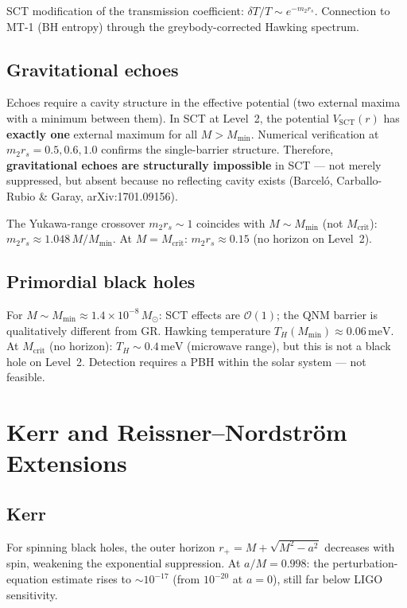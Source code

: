 \documentclass[11pt,a4paper]{article}
\newcommand{\order}[1]{\mathcal{O}(#1)}
\newcommand{\Msun}{M_\odot}
\newcommand{\Mcrit}{M_{\mathrm{crit}}}
\newcommand{\Mmin}{M_{\mathrm{min}}}
\begin{document}
SCT modification of the transmission coefficient:
$\delta T / T \sim e^{-m_2 r_s}$. Connection to MT-1 (BH entropy)
through the greybody-corrected Hawking spectrum.

\subsection{Gravitational echoes}

Echoes require a cavity structure in the effective potential (two external
maxima with a minimum between them). In SCT at Level~2, the potential
$V_{\mathrm{SCT}}(r)$ has \textbf{exactly one} external maximum for
all $M > \Mmin$. Numerical verification at $m_2 r_s = 0.5, 0.6, 1.0$
confirms the single-barrier structure. Therefore, \textbf{gravitational
echoes are structurally impossible} in SCT --- not merely suppressed,
but absent because no reflecting cavity exists
(Barcel\'o, Carballo-Rubio \& Garay, arXiv:1701.09156).

The Yukawa-range crossover $m_2 r_s \sim 1$ coincides with $M \sim \Mmin$
(not $\Mcrit$): $m_2 r_s \approx 1.048\,M/\Mmin$.
At $M = \Mcrit$: $m_2 r_s \approx 0.15$ (no horizon on Level~2).

\subsection{Primordial black holes}

For $M \sim \Mmin \approx 1.4 \times 10^{-8}\,\Msun$:
SCT effects are $\order{1}$; the QNM barrier is qualitatively different from GR.
Hawking temperature $T_H(M_{\min}) \approx 0.06\,\mathrm{meV}$.
At $\Mcrit$ (no horizon): $T_H \sim 0.4\,\mathrm{meV}$ (microwave range),
but this is not a black hole on Level~2.
Detection requires a PBH within the solar system --- not feasible.

\section{Kerr and Reissner--Nordstr\"om Extensions}\label{sec:kerr_rn}

\subsection{Kerr}

For spinning black holes, the outer horizon $r_+ = M + \sqrt{M^2 - a^2}$
decreases with spin, weakening the exponential suppression.
At $a/M = 0.998$: the perturbation-equation estimate rises to $\sim 10^{-17}$
(from $10^{-20}$ at $a = 0$), still far below LIGO sensitivity.
\end{document}
